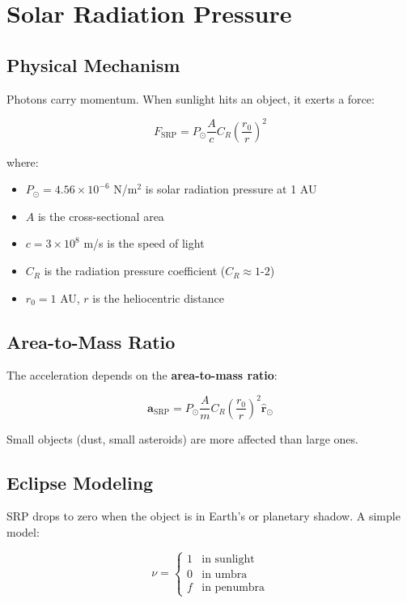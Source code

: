 \section{Solar Radiation Pressure}

\subsection{Physical Mechanism}

Photons carry momentum. When sunlight hits an object, it exerts a force:

\begin{equation}
    F_{\text{SRP}} = P_\odot \frac{A}{c} C_R \left(\frac{r_0}{r}\right)^2
\end{equation}

where:
\begin{itemize}
    \item $P_\odot = 4.56 \times 10^{-6}$ N/m$^2$ is solar radiation pressure at 1 AU
    \item $A$ is the cross-sectional area
    \item $c = 3 \times 10^8$ m/s is the speed of light
    \item $C_R$ is the radiation pressure coefficient ($C_R \approx 1$-$2$)
    \item $r_0 = 1$ AU, $r$ is the heliocentric distance
\end{itemize}

\subsection{Area-to-Mass Ratio}

The acceleration depends on the \textbf{area-to-mass ratio}:

\begin{equation}
    \mathbf{a}_{\text{SRP}} = P_\odot \frac{A}{m} C_R \left(\frac{r_0}{r}\right)^2 \hat{\mathbf{r}}_\odot
\end{equation}

Small objects (dust, small asteroids) are more affected than large ones.

\subsection{Eclipse Modeling}

SRP drops to zero when the object is in Earth's or planetary shadow. A simple model:

\begin{equation}
    \nu = \begin{cases}
        1 & \text{in sunlight} \\
        0 & \text{in umbra} \\
        f & \text{in penumbra}
    \end{cases}
\end{equation}

